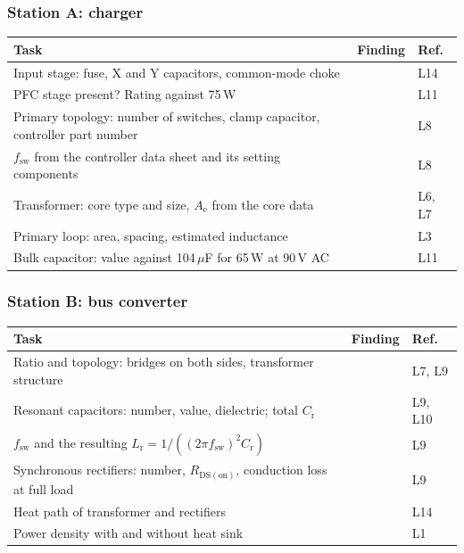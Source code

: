 \begin{frame}
	\frametitle{Station A: charger}
	\footnotesize
	\renewcommand{\arraystretch}{1.5}
	\begin{tabular}{|>{\raggedright\arraybackslash}p{6.2cm}|p{6.6cm}|l|}
		\hline
		\textbf{Task}                                                                  & \textbf{Finding} & \textbf{Ref.} \\
		\hline
		Input stage: fuse, X and Y capacitors, common-mode choke                       &                  & L14           \\
		PFC stage present? Rating against 75\,W                                        &                  & L11           \\
		Primary topology: number of switches, clamp capacitor, controller part number  &                  & L8            \\
		$f_\mathrm{sw}$ from the controller data sheet and its setting components      &                  & L8            \\
		Transformer: core type and size, $A_\mathrm{e}$ from the core data             &                  & L6, L7        \\
		Primary loop: area, spacing, estimated inductance                              &                  & L3            \\
		Bulk capacitor: value against 104\,$\mu$F for 65\,W at 90\,V AC                 &                  & L11           \\
		\hline
	\end{tabular}
\end{frame}

\begin{frame}
	\frametitle{Station B: bus converter}
	\footnotesize
	\renewcommand{\arraystretch}{1.5}
	\begin{tabular}{|>{\raggedright\arraybackslash}p{6.2cm}|p{6.6cm}|l|}
		\hline
		\textbf{Task}                                                                  & \textbf{Finding} & \textbf{Ref.} \\
		\hline
		Ratio and topology: bridges on both sides, transformer structure               &                  & L7, L9        \\
		Resonant capacitors: number, value, dielectric; total $C_\mathrm{r}$           &                  & L9, L10       \\
		$f_\mathrm{sw}$ and the resulting $L_\mathrm{r}=1/((2\pi f_\mathrm{sw})^2C_\mathrm{r})$ &         & L9            \\
		Synchronous rectifiers: number, $R_\mathrm{DS(on)}$, conduction loss at full load &               & L9            \\
		Heat path of transformer and rectifiers                                        &                  & L14           \\
		Power density with and without heat sink                                       &                  & L1            \\
		\hline
	\end{tabular}
\end{frame}

